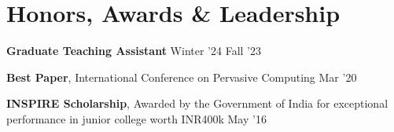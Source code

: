 \section{\bfseries Honors, Awards \& Leadership}
\vspace{1pt}
 \begin{itemize}[leftmargin=0.05in, label={}]
    \small{
    \item{
    \textbf{Graduate Teaching Assistant}{
        \vspace{-4pt}
        \resumeItemListStart
             \hfill {Winter '24}
             \hfill {Fall '23}
        \resumeItemListEnd
    }
    }
    \item {\textbf{Best Paper}, International Conference on Pervasive Computing} \hfill { Mar '20} 
    \vspace{-4pt}
    \item{\textbf{INSPIRE Scholarship}, {Awarded by the Government of India for exceptional performance in junior college worth INR400k }} \hfill {May '16}
    }
 \end{itemize}